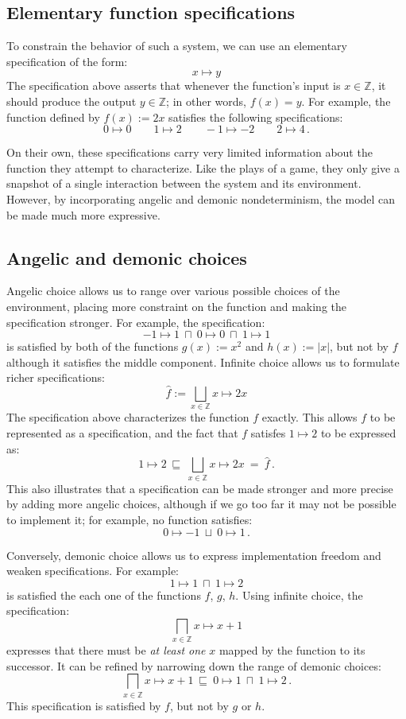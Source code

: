 \documentclass[draft,11pt]{report}
\theoremstyle{definition}
\newcommand{\refby}{\sqsubseteq} %
\begin{document}
\subsection{Elementary function specifications} %

To constrain the behavior of such a system,
we can use an elementary specification of the form:
\[
  x \mapsto y
\]
The specification above asserts that
whenever the function's input is $x \in \mathbb{Z}$,
it should produce the output $y \in \mathbb{Z}$;
in other words, $f(x) = y$.
For example,
the function defined by $f(x) := 2x$
satisfies the following specifications:
\[
  0 \mapsto 0 \qquad
  1 \mapsto 2 \qquad
  -1 \mapsto -2 \qquad
  2 \mapsto 4
  \,.
\]

On their own,
these specifications
carry very limited information about the function
they attempt to characterize.
Like the plays of a game,
they only give a snapshot of a single
interaction between the system and its environment.
However,
by incorporating angelic and demonic nondeterminism,
the model can be made much more expressive.


\subsection{Angelic and demonic choices} %

Angelic choice allows us to range over
various possible choices of the environment,
placing more constraint on the function and
making the specification stronger.
For example,
the specification:
\[
    -1 \mapsto 1
    \: \sqcap \:
    0 \mapsto 0
    \: \sqcap \:
    1 \mapsto 1
\]
is satisfied by both of the functions
$g(x) := x^2$ and $h(x) := |x|$,
but not by $f$ although it satisfies the middle component.
Infinite choice allows us to formulate
richer specifications:
\[
  \hat{f} := \bigsqcup_{x \in \mathbb{Z}} x \mapsto 2x
\]
The specification above characterizes the function $f$ exactly.
This allows $f$ to be represented as a specification,
and the fact that $f$ satisfes $1 \mapsto 2$ to be expressed as:
\[
  1 \mapsto 2
  \: \sqsubseteq \:
  \bigsqcup_{x \in \mathbb{Z}} x \mapsto 2x
  \: = \:
  \hat{f}
  \,.
\]
This also illustrates that
a specification can be made stronger
and more precise by adding more angelic choices,
although if we go too far it may not be possible to implement it;
for example, no function satisfies:
\[
  0 \mapsto -1 \: \sqcup \: 0 \mapsto 1
  \,.
\]

Conversely,
demonic choice allows us to express
implementation freedom and weaken specifications.
For example:
\[
    1 \mapsto 1 \: \sqcap \: 1 \mapsto 2
\]
is satisfied the each one of the functions $f$, $g$, $h$.
Using infinite choice,
the specification:
\[
    \bigsqcap_{x \in \mathbb{Z}} x \mapsto x + 1
\]
expresses that there must be \emph{at least one} $x$
mapped by the function to its successor.
It can be refined by narrowing down the range
of demonic choices:
\[
  \bigsqcap_{x \in \mathbb{Z}} x \mapsto x + 1
  \: \refby \:
  0 \mapsto 1
  \: \sqcap \:
  1 \mapsto 2
  \,.
\]
This specification is satisfied by $f$,
but not by $g$ or $h$.
\end{document}
